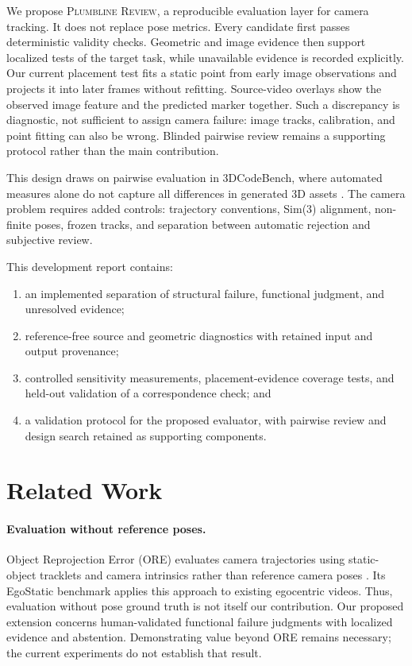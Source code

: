 \documentclass[10pt,twocolumn]{article}
\newcommand{\method}{\textsc{Plumbline Review}}
\begin{document}
We propose \method, a reproducible evaluation layer for camera tracking. It does not replace pose metrics. Every candidate first passes deterministic validity checks. Geometric and image evidence then support localized tests of the target task, while unavailable evidence is recorded explicitly. Our current placement test fits a static point from early image observations and projects it into later frames without refitting. Source-video overlays show the observed image feature and the predicted marker together. Such a discrepancy is diagnostic, not sufficient to assign camera failure: image tracks, calibration, and point fitting can also be wrong. Blinded pairwise review remains a supporting protocol rather than the main contribution.

This design draws on pairwise evaluation in 3DCodeBench, where automated measures alone do not capture all differences in generated 3D assets \cite{gao2026codebench}. The camera problem requires added controls: trajectory conventions, Sim(3) alignment, non-finite poses, frozen tracks, and separation between automatic rejection and subjective review.

This development report contains:
\begin{enumerate}
  \item an implemented separation of structural failure, functional judgment, and unresolved evidence;
  \item reference-free source and geometric diagnostics with retained input and output provenance;
  \item controlled sensitivity measurements, placement-evidence coverage tests, and held-out validation of a correspondence check; and
  \item a validation protocol for the proposed evaluator, with pairwise review and design search retained as supporting components.
\end{enumerate}

\section{Related Work}
\paragraph{Evaluation without reference poses.} Object Reprojection Error (ORE) evaluates camera trajectories using static-object tracklets and camera intrinsics rather than reference camera poses \cite{chen2023ore}. Its EgoStatic benchmark applies this approach to existing egocentric videos. Thus, evaluation without pose ground truth is not itself our contribution. Our proposed extension concerns human-validated functional failure judgments with localized evidence and abstention. Demonstrating value beyond ORE remains necessary; the current experiments do not establish that result.
\end{document}
